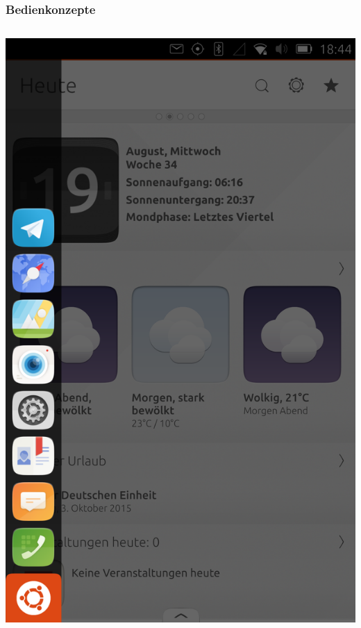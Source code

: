 \documentclass{beamer}
\begin{document}
\begin{frame}
  \frametitle{Bedienkonzepte}
  \begin{columns}
      \includegraphics[width=\textwidth]{images/unity-launcher}

\end{columns}
\end{frame}
\end{document}
